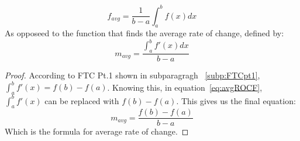 \documentclass{article} %
\theoremstyle{theorem}
\theoremstyle{definition}
\begin{document}
                    \begin{equation}
                        f_{avg}=\frac{1}{b-a}\int_{a}^{b}f(x)dx
                        \label{eq:avgValF}
                    \end{equation}
                As opposeed to the function that finds the average rate of change, defined by:
                \begin{equation}
                    \label{eq:avgROCF}
                    m_{avg}=\dfrac{\int_a^bf'(x)dx}{b-a}
                \end{equation}
                \begin{proof}
                    According to FTC Pt.1 shown in subparagragh ~\ref{subp:FTCpt1}, $\int_a^bf'(x) = f(b)-f(a)$.
                    Knowing this, in equation~\ref{eq:avgROCF}, $\int_a^bf'(x)$ can be replaced with $f(b)-f(a)$. This gives us the final equation:
                    \[
                        m_{avg}=\frac{f(b)-f(a)}{b-a}
                    \]
                    Which is the formula for average rate of change.
                \end{proof}
            \pagebreak
\end{document}
